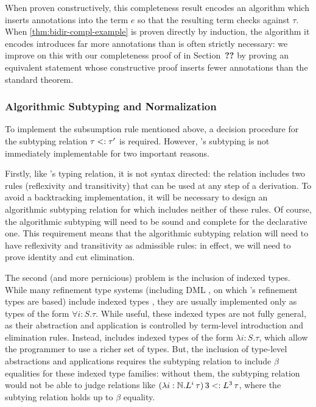 When proven constructively, this completeness result encodes an algorithm which inserts annotations into the term $e$ so that the resulting term checks against $\tau$. When \autoref{thm:bidir-compl-example} is proven directly by induction, the algorithm it encodes introduces far more annotations than is often strictly necessary: we improve on this with our completeness proof of \bilambdaamor in Section~\textbf{??} by proving an equivalent statement whose constructive proof inserts fewer annotations than the standard theorem.

\subsubsection{Algorithmic Subtyping and Normalization}
To implement the subsumption rule mentioned above, a decision procedure for the subtyping relation $\tau <: \tau'$ is required. However, \dlambdaamor's subtyping is not immediately implementable for two important reasons.

Firstly, like \dlambdaamor's typing relation, it is not syntax directed: the relation includes two rules (reflexivity and transitivity) that can be used at any step of a derivation. To avoid a backtracking implementation, it will be necessary to design an algorithmic subtyping relation for \bilambdaamor which includes neither of these rules. Of course, the algorithmic subtyping will need to be sound and complete for the declarative one. This requirement means that the algorithmic subtyping relation will need to have reflexivity and transitivity as admissible rules: in effect, we will need to prove identity and cut elimination.

The second (and more pernicious) problem is the inclusion of indexed types. While many refinement type systems (including DML \cite{xi:jfp07}, on which \lambdaamor's refinement types are based) include indexed types \cite{zenger:tcs97}, they are usually implemented only as types of the form $\forall i : S. \tau$. While useful, these indexed types are not fully general, as their abstraction and application is controlled by term-level introduction and elimination rules. Instead, \dlambdaamor includes indexed types of the form $\lambda i : S. \tau$, which allow the programmer to use a richer set of types. But, the inclusion of type-level abstractions and applications requires the subtyping relation to include $\beta$ equalities for these indexed type families: without them, the subtyping relation would not be able to judge relations like $(\lambda i : \mathbb{N}. L^i\, \tau) \, 3 <: L^3 \, \tau$, where the subtying relation holds up to $\beta$ equality.


